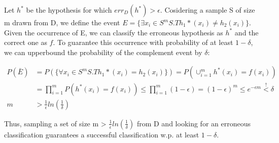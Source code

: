 Let $h^*$ be the hypothesis for which $err_D(h^*) > \epsilon$. Cosidering a sample S of size m drawn from D, we define the event
$E = \{\exists x_i \in S^m S.T h_1*(x_i) \neq h_2(x_i)\}$. Given the occurrence of E, we can classify the erroneous hypothesis as $h^*$ and the correct one as $f$. To guarantee this occurrence with probability of at least $1-\delta$, we can upperbound the probability of the complement event by $\delta$:

\begin{equation*}
    \begin{split}
        P(\bar{E}) &= P(\{\forall x_i \in S^m S.T h_1*(x_i) = h_2(x_i)\}) = P(\cup_{i=1}^m h^*(x_i) = f(x_i)) \\
        &= \prod_{i=1}^m P(h^*(x_i) = f(x_i)) \leq \prod_{i=1}^m (1-\epsilon) = (1-\epsilon)^m \leq e^{-\epsilon m} \overset{!}{<} \delta \\
        m &> \frac{1}{\epsilon} ln(\frac{1}{\delta})
    \end{split}
\end{equation*}

Thus, sampling a set of size m > $\frac{1}{\epsilon} ln(\frac{1}{\delta})$ from D and looking for an erroneous classification guarantees a successful classification w.p. at least $1-\delta$.